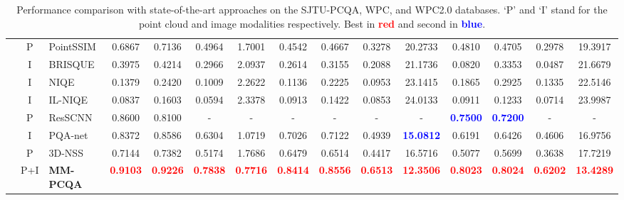 \documentclass{article}
\begin{document}
\begin{table*}[th]
\begin{tabular}{c:c:l|cccc|cccc|cccc}
& P & PointSSIM    & 0.6867  & 0.7136  & 0.4964 & 1.7001  & 0.4542    & 0.4667    & 0.3278   & 20.2733  & 0.4810 & 0.4705 & 0.2978 & 19.3917 \\ \hdashline
{} 
&I &BRISQUE  & 0.3975    & 0.4214  & 0.2966 & 2.0937  & 0.2614    & 0.3155  & 0.2088 & 21.1736  & 0.0820  & 0.3353	& 0.0487 & 21.6679
\\
&I &NIQE  &0.1379 &0.2420 &0.1009 &2.2622  &0.1136 & 0.2225 &0.0953 &23.1415 & 0.1865 & 0.2925 & 0.1335 & 22.5146
 \\
&I &IL-NIQE  & 0.0837 & 0.1603 & 0.0594 &2.3378 &0.0913 &0.1422 & 0.0853 &24.0133 & 0.0911 & 0.1233 & 0.0714 & 23.9987\\
&P &ResSCNN  & 0.8600 & 0.8100 & - & - & - & - & - & - & \bf\textcolor{blue}{0.7500} & \bf\textcolor{blue}{0.7200} &-&- \\
&I &PQA-net  & 0.8372   & 0.8586    & 0.6304 & {1.0719}  & {0.7026}    & {0.7122}    & {0.4939}   & \bf\textcolor{blue}{15.0812} & 0.6191 & 0.6426 & 0.4606 & 16.9756    \\
&P &3D-NSS     & 0.7144 & 0.7382  & 0.5174 & 1.7686    & 0.6479    & 0.6514    & 0.4417   & 16.5716 & 0.5077 & 0.5699 & 0.3638 & 17.7219 \\ 
&P+I &\textbf{MM-PCQA}     & \bf\textcolor{red}{0.9103}   & \bf\textcolor{red}{0.9226}   & \bf\textcolor{red}{0.7838} & \bf\textcolor{red}{0.7716} &\bf\textcolor{red}{0.8414}    & \bf\textcolor{red}{0.8556}    & \bf\textcolor{red}{0.6513}  & \bf\textcolor{red}{12.3506} &\bf\textcolor{red}{0.8023}    & \bf\textcolor{red}{0.8024}    & \bf\textcolor{red}{0.6202}  & \bf\textcolor{red}{13.4289} \\

                      \bottomrule
\end{tabular}
\caption{Performance comparison with state-of-the-art approaches on the SJTU-PCQA, WPC, and WPC2.0 databases. ‘P’ and ‘I’ stand for the point cloud and image modalities respectively. Best in {\bf\textcolor{red}{red}} and second in {\bf\textcolor{blue}{blue}}. }
\label{tab:experiment}
\end{table*}
\end{document}
